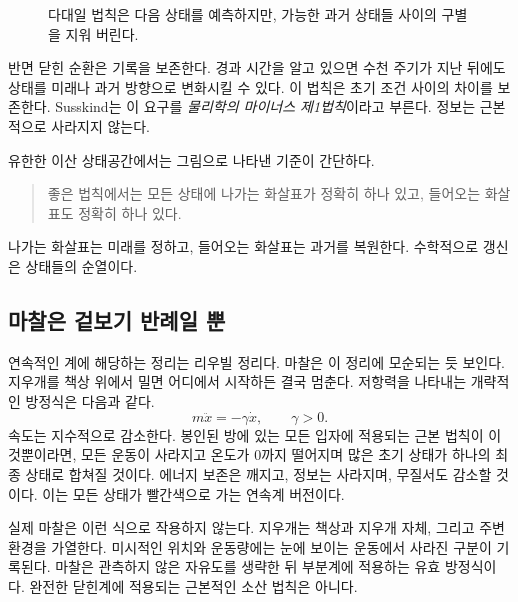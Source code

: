 \begin{figure}[htbp]
\centering
{}
\caption{다대일 법칙은 다음 상태를 예측하지만, 가능한 과거 상태들 사이의 구별을 지워 버린다.}
\label{fig:sm1-bad-law}
\end{figure}

반면 닫힌 순환은 기록을 보존한다. 경과 시간을 알고 있으면 수천 주기가 지난 뒤에도 상태를 미래나 과거 방향으로 변화시킬 수 있다. 이 법칙은 초기 조건 사이의 차이를 보존한다. Susskind는 이 요구를 \emph{물리학의 마이너스 제1법칙}이라고 부른다. 정보는 근본적으로 사라지지 않는다.

유한한 이산 상태공간에서는 그림으로 나타낸 기준이 간단하다.
\begin{quote}
좋은 법칙에서는 모든 상태에 나가는 화살표가 정확히 하나 있고, 들어오는 화살표도 정확히 하나 있다.
\end{quote}
나가는 화살표는 미래를 정하고, 들어오는 화살표는 과거를 복원한다. 수학적으로 갱신은 상태들의 순열이다.

\subsection{마찰은 겉보기 반례일 뿐}

연속적인 계에 해당하는 정리는 리우빌 정리다. 마찰은 이 정리에 모순되는 듯 보인다. 지우개를 책상 위에서 밀면 어디에서 시작하든 결국 멈춘다. 저항력을 나타내는 개략적인 방정식은 다음과 같다.
\begin{equation}
 m\ddot x=-\gamma\dot x,
 \qquad \gamma>0.
 \label{eq:sm1-drag}
\end{equation}
속도는 지수적으로 감소한다. 봉인된 방에 있는 모든 입자에 적용되는 근본 법칙이 이것뿐이라면, 모든 운동이 사라지고 온도가 0까지 떨어지며 많은 초기 상태가 하나의 최종 상태로 합쳐질 것이다. 에너지 보존은 깨지고, 정보는 사라지며, 무질서도 감소할 것이다. 이는 모든 상태가 빨간색으로 가는 연속계 버전이다.

실제 마찰은 이런 식으로 작용하지 않는다. 지우개는 책상과 지우개 자체, 그리고 주변 환경을 가열한다. 미시적인 위치와 운동량에는 눈에 보이는 운동에서 사라진 구분이 기록된다. 마찰은 관측하지 않은 자유도를 생략한 뒤 부분계에 적용하는 유효 방정식이다. 완전한 닫힌계에 적용되는 근본적인 소산 법칙은 아니다.

